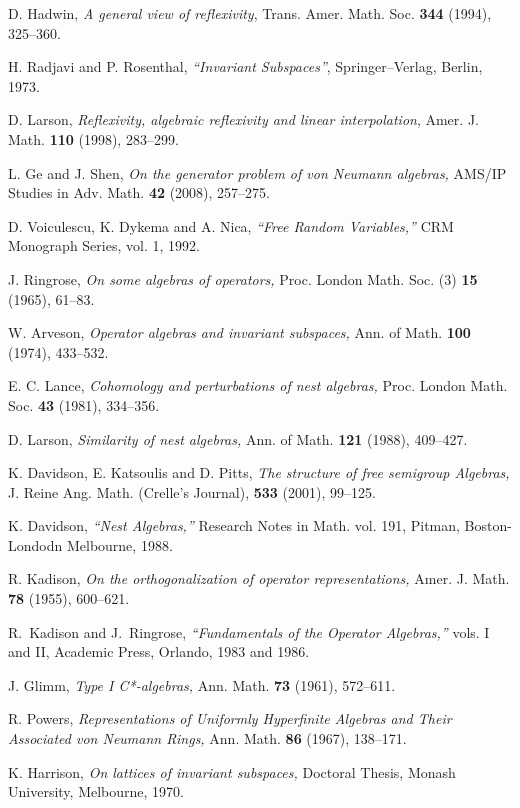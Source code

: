 \documentclass{pnastwo}
\begin{document}
\begin{article}
\begin{thebibliography}{21}
 D. Hadwin, {\em A general view of reflexivity}, Trans.
Amer. Math. Soc. {\bf 344} (1994), 325--360.


 H. Radjavi and P. Rosenthal, {\em ``Invariant
Subspaces''}, Springer--Verlag, Berlin, 1973.

 D. Larson, {\em Reflexivity, algebraic reflexivity and
linear interpolation}, Amer. J. Math. {\bf 110} (1998),
283--299.

 L. Ge and J. Shen, {\em On the generator problem of
von Neumann algebras,} AMS/IP Studies in Adv. Math. {\bf 42}
(2008), 257--275.

 D. Voiculescu, K. Dykema and A. Nica, {\em ``Free
Random Variables,''}     CRM Monograph Series, vol. 1, 1992.

 J. Ringrose, {\em On some algebras of operators,} Proc.
London Math. Soc. (3) {\bf 15} (1965), 61--83.

 W. Arveson, {\em Operator algebras and invariant
subspaces,}  Ann. of Math. {\bf 100} (1974), 433--532.

 E. C. Lance, {\em Cohomology and perturbations of nest
algebras,} Proc. London Math. Soc. {\bf 43} (1981), 334--356.

 D. Larson, {\em Similarity of nest algebras,} Ann. of
Math. {\bf 121} (1988), 409--427.


 K. Davidson, E. Katsoulis and D. Pitts, {\em The
structure of free semigroup Algebras,}  J. Reine Ang. Math.
(Crelle's Journal), {\bf 533} (2001), 99--125.

  K. Davidson, {\em ``Nest Algebras,''} Research Notes
in Math. vol. 191, Pitman, Boston-Londodn Melbourne, 1988.

  R. Kadison,
     {\em On the orthogonalization of operator
     representations,} Amer. J. Math.
     {\bf 78}  (1955),  600--621.
     
 R.\ Kadison and J.\ Ringrose, {\em ``Fundamentals of
the Operator Algebras,''} vols. I and II, Academic Press, Orlando,
1983 and 1986.

 J. Glimm, {\em Type I C*-algebras,} Ann. Math.
{\bf 73} (1961), 572--611.

 R. Powers,  {\em Representations of Uniformly
Hyperfinite Algebras and Their Associated von Neumann Rings,} Ann.
Math. {\bf 86} (1967), 138--171.

 K. Harrison, {\em On lattices of invariant subspaces,}
Doctoral Thesis, Monash University, Melbourne, 1970.

\end{thebibliography}

\end{article}
\end{document}
